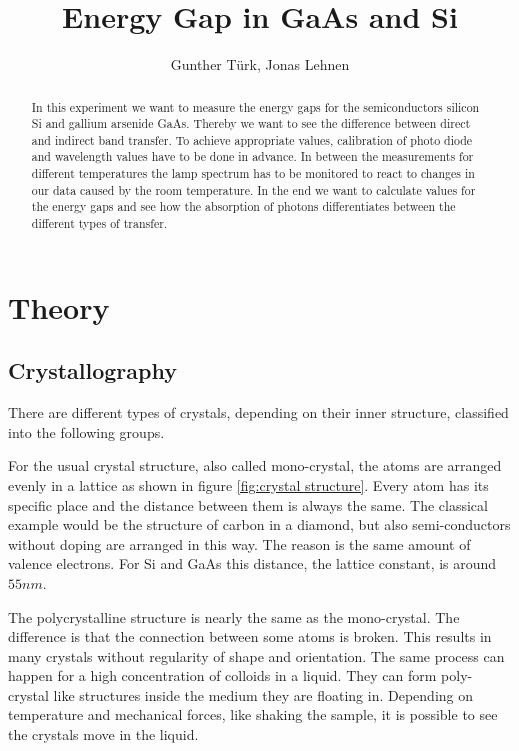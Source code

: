 \documentclass[]{article}
\title{Energy Gap in GaAs and Si}
\author{Gunther T\"urk, Jonas Lehnen}
\begin{document}
\maketitle
\begin{abstract}
In this experiment we want to measure the energy gaps for the semiconductors silicon Si and gallium arsenide GaAs. Thereby we want to see the difference between direct and indirect band transfer. To achieve appropriate values, calibration of photo diode and wavelength values have to be done in advance. In between the measurements for different temperatures the lamp spectrum has to be monitored to react to changes in our data caused by the room temperature. In the end we want to calculate values for the energy gaps and see how the absorption of photons differentiates between the different types of transfer.

\end{abstract}

\tableofcontents

\newpage
\section{Theory}
\subsection{Crystallography}
There are different types of crystals, depending on their inner structure, classified into the following groups. 

For the usual crystal structure, also called mono-crystal, the atoms are arranged evenly in a lattice as shown in figure \ref{fig:crystal structure}. Every atom has its specific place and the distance between them is always the same. The classical example would be the structure of carbon in a diamond, but also semi-conductors without doping are arranged in this way. The reason is the same amount of valence electrons. For Si and GaAs this distance, the lattice constant, is around $55nm$.

The polycrystalline structure is nearly the same as the mono-crystal. The difference is that the connection between some atoms is broken. This results in many crystals without regularity of shape and orientation. The same process can happen for a high concentration of colloids in a liquid. They can form poly-crystal like structures inside the medium they are floating in. Depending on temperature and mechanical forces, like shaking the sample, it is possible to see the crystals move in the liquid.
\end{document}
